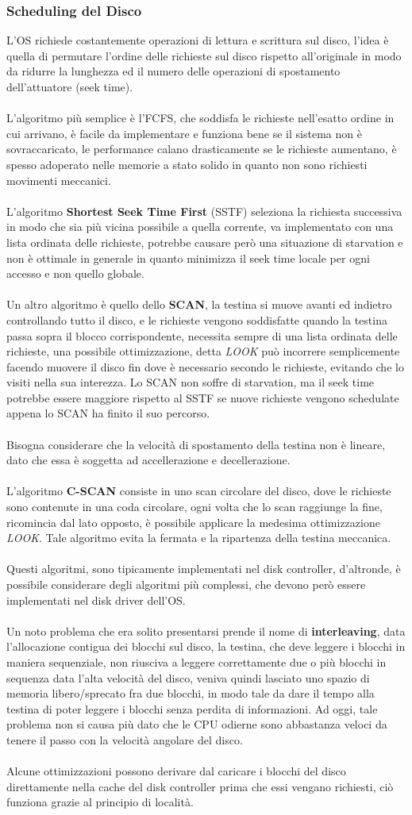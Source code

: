 \documentclass[12pt, letterpaper]{article}
\newcommand{\acc}{\\\hphantom{}\\}
\begin{document}
\subsubsection{Scheduling del Disco}
L'OS richiede costantemente operazioni di lettura e scrittura sul disco, l'idea è quella di permutare l'ordine delle 
richieste sul disco rispetto all'originale in modo da ridurre la lunghezza ed il numero delle operazioni di spostamento 
dell'attuatore (seek time). \acc 
L'algoritmo più semplice è l'FCFS, che soddisfa le richieste nell'esatto ordine in cui arrivano, è facile da implementare e 
funziona bene se il sistema non è sovraccaricato, le performance calano drasticamente se le richieste aumentano, è spesso 
adoperato nelle memorie a stato solido in quanto non sono richiesti movimenti meccanici.\acc 
L'algoritmo \textbf{Shortest Seek Time First} (SSTF) seleziona la richiesta successiva in modo che sia più 
vicina possibile a quella corrente, va implementato con una lista ordinata delle richieste, potrebbe causare 
però una situazione di starvation e non è ottimale in generale in quanto minimizza il seek time locale per 
ogni accesso e non quello globale.\acc Un altro algoritmo è quello dello \textbf{SCAN}, la testina si muove avanti ed 
indietro controllando tutto il disco, e le richieste vengono soddisfatte quando la testina passa sopra il blocco 
corrispondente, necessita sempre  di una lista ordinata delle richieste, una possibile ottimizzazione, detta \textit{LOOK} può incorrere semplicemente 
facendo muovere il disco fin dove è necessario secondo le richieste, evitando che lo visiti nella sua interezza. 
Lo SCAN non soffre di starvation, ma il seek time potrebbe essere maggiore rispetto al SSTF se nuove richieste vengono 
schedulate appena lo SCAN ha finito il suo percorso.\acc Bisogna considerare che la velocità di spostamento 
della testina non è lineare, dato che essa è soggetta ad accellerazione e decellerazione.\acc L'algoritmo \textbf{C-SCAN} 
consiste in uno scan circolare del disco, dove le richieste sono contenute in una coda circolare, ogni volta che lo scan 
raggiunge la fine, ricomincia dal lato opposto, è possibile applicare la medesima ottimizzazione \textit{LOOK}. Tale 
algoritmo evita la fermata e la ripartenza della testina meccanica. \acc 
Questi algoritmi, sono tipicamente implementati nel disk controller, d'altronde, è possibile considerare degli 
algoritmi più complessi, che devono però essere implementati nel disk driver dell'OS.
\acc 
Un noto problema che era solito presentarsi prende il nome di \textbf{interleaving}, data l'allocazione 
contigua dei blocchi sul disco, la testina, che deve leggere i blocchi in maniera sequenziale, non riusciva 
a leggere correttamente due o più blocchi in sequenza data l'alta velocità del disco, veniva quindi lasciato uno 
spazio di memoria libero/sprecato fra due blocchi, in modo tale da dare il tempo alla testina di poter 
leggere i blocchi senza perdita di informazioni. Ad oggi, tale problema non si causa più dato che le CPU 
odierne sono abbastanza veloci da tenere il passo con la velocità angolare del disco.
\acc Alcune ottimizzazioni 
possono derivare dal caricare i blocchi del disco direttamente nella cache del disk controller prima che essi vengano 
richiesti, ciò funziona grazie al principio di località.
\end{document}
